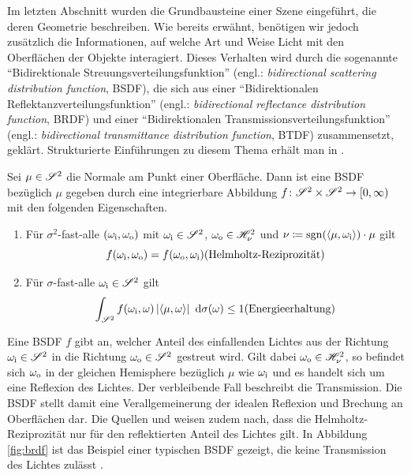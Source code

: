 		Im letzten Abschnitt wurden die Grundbausteine einer Szene eingeführt, die deren Geometrie beschreiben.
		Wie bereits erwähnt, benötigen wir jedoch zusätzlich die Informationen, auf welche Art und Weise Licht mit den Oberflächen der Objekte interagiert.
		Dieses Verhalten wird durch die sogenannte \enquote{Bidirektionale Streuungsverteilungsfunktion} (engl.: \textit{bidirectional scattering distribution function}, BSDF), die sich aus einer \enquote{Bidirektionalen Reflektanzverteilungsfunktion} (engl.: \textit{bidirectional reflectance distribution function}, BRDF) und einer \enquote{Bidirektionalen Transmissionsverteilungsfunktion} (engl.: \textit{bidirectional transmittance distribution function}, BTDF) zusammensetzt, geklärt.
		Strukturierte Einführungen zu diesem Thema erhält man in \cite{pbrt3,veach-thesis,real-time-render,intro-brdf,radiosity}.
		\begin{definition}
			Sei $\mu\in\mathscr{S}^{2}$ die Normale am Punkt einer Oberfläche.
			Dann ist eine BSDF bezüglich $\mu$ gegeben durch eine integrierbare Abbildung $f\colon\mathscr{S}^{2}\times\mathscr{S}^{2}\to[0,\infty)$ mit den folgenden Eigenschaften.

			\begin{enumerate}[label = \normalfont{(\roman*)}]
				\item
				Für $\sigma^2$-fast-alle $(\omega_{\mathrm{i}},\omega_{\mathrm{o}})$ mit $\omega_{\mathrm{i}}\in\mathscr{S}^{2}$, $\omega_{\mathrm{o}}\in\mathscr{H}^{2}_{\nu}$ und $\nu\coloneqq\operatorname{sgn}(\left\langle \mu,\omega_{\mathrm{i}} \right\rangle)\cdot\mu$ gilt
				\[
					f(\omega_\m{i},\omega_\m{o}) = f(\omega_\m{o},\omega_\m{i}) \hfill \text{(Helmholtz-Reziprozität)}
				\]

				\item
				Für $\sigma$-fast-alle $\omega_{\mathrm{i}}\in\mathscr{S}^{2}$ gilt
				\[
					\integral{\ssp}{}{f(\omega_\m{i},\omega) \abs{\dotp{\mu}{\omega}}}{\sigma(\omega)} \leq 1 \hfill \text{(Energieerhaltung)}
				\]
			\end{enumerate}
		\end{definition}

		Eine BSDF $f$ gibt an, welcher Anteil des einfallenden Lichtes aus der Richtung $\omega_{\mathrm{i}}\in\mathscr{S}^{2}$ in die Richtung $\omega_{\mathrm{o}}\in\mathscr{S}^{2}$ gestreut wird.
		Gilt dabei $\omega_{\mathrm{o}}\in\mathscr{H}^{2}_{\nu}$, so befindet sich $\omega_{\mathrm{o}}$ in der gleichen Hemisphere bezüglich $\mu$ wie $\omega_{\mathrm{i}}$ und es handelt sich um eine Reflexion des Lichtes.
		Der verbleibende Fall beschreibt die Transmission.
		Die BSDF stellt damit eine Verallgemeinerung der idealen Reflexion und Brechung an Oberflächen dar.
		Die Quellen \cite[S.~571~ff]{pbrt3} und \cite[S.~135~ff]{veach-thesis} weisen zudem nach, dass die Helmholtz-Reziprozität nur für den reflektierten Anteil des Lichtes gilt.
		In Abbildung \ref{fig:brdf} ist das Beispiel einer typischen BSDF gezeigt, die keine Transmission des Lichtes zulässt \cite[S.~509~ff]{pbrt3}.


